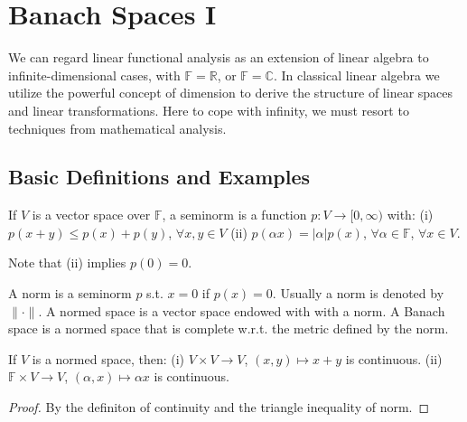 \chapter{Banach Spaces I}

We can regard linear functional analysis as an extension of linear algebra to infinite-dimensional cases,
with $\mathbb{F}=\mathbb{R}$, or $\mathbb{F}=\mathbb{C}$.
In classical linear algebra we utilize the powerful concept of dimension to derive the structure of linear spaces and linear transformations.
Here to cope with infinity, we must resort to techniques from mathematical analysis.





\section{Basic Definitions and Examples}
\begin{definition}[Seminorm]
    If $V$ is a vector space over $\mathbb{F}$, a seminorm is a function $p:V\to [0,\infty)$ with:\newline 
    (i) $p(x+y)\le p(x)+p(y)$, $\forall x,y\in V$ \newline
    (ii) $p(\alpha x)=\left|\alpha\right|p(x)$, $\forall \alpha\in \mathbb{F}$, $\forall x\in V$.
\end{definition}
Note that (ii) implies $p(0)=0$.
\begin{definition}[Norm]
    A norm is a seminorm $p$ s.t. $x=0$ if $p(x)=0$. Usually a norm is denoted by $\|\cdot\|$.
    A normed space is a vector space endowed with with a norm. A Banach space is a normed space that is complete w.r.t. the metric defined by the norm.
\end{definition}

\begin{lemma}[Continuity]
    If $V$ is a normed space, then: \newline 
    (i) $V\times V\to V$, $(x,y)\mapsto x+y$ is continuous. \newline
    (ii) $\mathbb{F}\times V\to V$, $(\alpha,x)\mapsto \alpha x$ is continuous.
\end{lemma}
\begin{proof}
    By the definiton of continuity and the triangle inequality of norm.
\end{proof}

